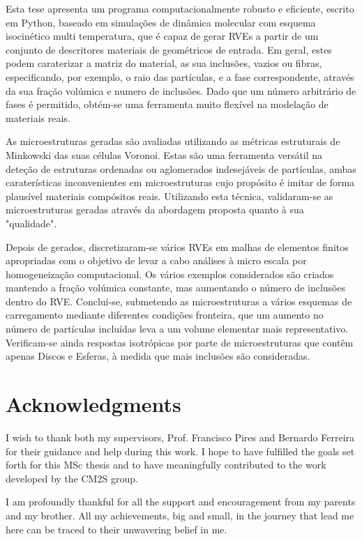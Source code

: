 \documentclass[a4paper, openright, twoside]{report}
\begin{document}
Esta tese apresenta um programa computacionalmente robusto e eficiente, escrito em Python, baseado em simulações de dinâmica molecular com esquema isocinético multi temperatura, que é capaz de gerar RVEs a partir de um conjunto de descritores materiais de geométricos de entrada.
Em geral, estes podem caraterizar a matriz do material, as sua inclusões, vazios ou fibras, especificando, por exemplo, o raio das partículas, e a fase correspondente, através da sua fração volúmica e numero de inclusões.
Dado que um número arbitrário de fases é permitido, obtém-se uma ferramenta muito flexível na modelação de materiais reais.

As microestruturas geradas são avaliadas utilizando as métricas estruturais de Min\-kow\-ski das suas células Voronoi.
Estas são uma ferramenta versátil na deteção de estruturas ordenadas ou aglomerados indesejáveis de partículas, ambas caraterísticas inconvenientes em microestruturas cujo propósito é imitar de forma plausível materiais compósitos reais.
Utilizando esta técnica, validaram-se as microestruturas geradas através da abordagem proposta quanto à sua "qualidade".

Depois de gerados, discretizaram-se vários RVEs em malhas de elementos finitos apropriadas com o objetivo de levar a cabo análises à micro escala por homogeneização computacional.
Os vários exemplos considerados são criados mantendo a fração volúmica constante, mas aumentando o número de inclusões dentro do RVE.
Concluí-se, submetendo as microestruturas a vários esquemas de carregamento mediante diferentes condições fronteira, que um aumento no número de partículas incluídas leva a um volume elementar mais representativo.
Verificam-se ainda respostas isotrópicas por parte de microestruturas que contêm apenas Discos e Esferas, à medida que mais inclusões são consideradas.

\newpage\null\thispagestyle{blank}\newpage

\chapter*{Acknowledgments}

I wish to thank both my supervisors, Prof. Francisco Pires and Bernardo Ferreira for their guidance and help during this work.
I hope to have fulfilled the goals set forth for this MSc thesis and to have meaningfully contributed to the work developed by the CM2S group.

I am profoundly thankful for all the support and encouragement from my parents and my brother.
All my achievements, big and small, in the journey that lead me here can be traced to their unwavering belief in me.
\end{document}
